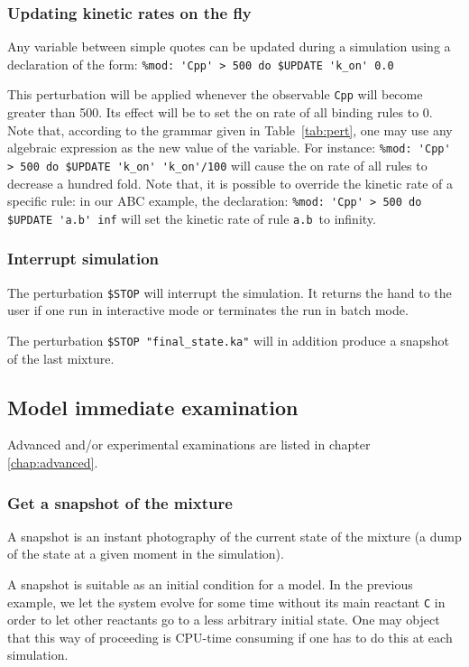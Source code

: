 \documentclass[11pt]{book}
\def\ttt#1{\texttt{#1}}
\def\var#1{{\textquotesingle}#1{\textquotesingle}}
\def\noi{\noindent}
\begin{document}
\subsubsection{Updating kinetic rates on the fly}

Any variable between simple quotes can be updated during a simulation using a declaration of the form:
\lstinline[language=kappa]!%mod: 'Cpp' > 500 do $UPDATE 'k_on' 0.0!

This perturbation will be applied whenever the observable \ttt{\var{Cpp}} will become greater than 500. Its effect will be to set the on rate of all binding rules to 0. Note that, according to the grammar given in Table~\ref{tab:pert}, one may use any algebraic expression as the new value of the variable. For instance:
\lstinline[language=kappa]!%mod: 'Cpp' > 500 do $UPDATE 'k_on' 'k_on'/100!
\noi will cause the on rate of all rules to decrease a hundred fold. Note that, it is possible to override the kinetic rate of a specific rule:  in our ABC example, the declaration:
\lstinline[language=kappa]!%mod: 'Cpp' > 500 do $UPDATE 'a.b' inf!
\noi will set the kinetic rate of rule \ttt{\var{a.b}}~to infinity.

\subsubsection{Interrupt simulation}
The perturbation \ttt{\$STOP} will interrupt the simulation. It
returns the hand to the user if one run in interactive mode or
terminates the run in batch mode.

The perturbation \ttt{\$STOP "final\_state.ka"} will in addition
produce a snapshot of the last mixture.

\subsection{Model immediate examination}
Advanced and/or experimental examinations are listed in chapter \ref{chap:advanced}.

\subsubsection{Get a snapshot of the mixture}

A snapshot is an instant photography of the current state of the
mixture (a dump of the state at a given moment in the simulation).

A snapshot is suitable as an initial condition for a model.
In the previous example, we let the system evolve for some time
without its main reactant \ttt{C} in order to let other reactants go
to a less arbitrary initial state. One may object that this way of
proceeding is CPU-time consuming if one has to do this at each
simulation.
\end{document}
